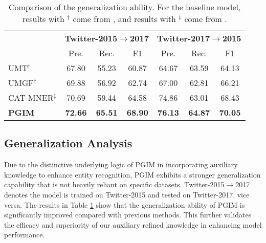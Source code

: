 \documentclass[11pt]{article}
\begin{document}
\begin{table*}[!]
\begin{tabular}{lcccc|ccc|c|c|c}
\bottomrule
\end{tabular}
\caption{Comparison of MoRe with PGIM. Since the original paper of MoRe \citep{wang2022named} did not report its Single Type (F1) on the Twitter-2015 and Twitter-2017 datasets, we run its released code and count the results. All of the results are averaged from 3 runs with different random seeds. }
\label{tab:PGIM&MORE}
\end{table*}


\begin{table}[t!]
\small
\setlength\tabcolsep{3pt}
\renewcommand{\arraystretch}{1.2}
\centering
\begin{tabular}{l|cccccc}
\toprule
& \multicolumn{3}{c|}{\textbf{Twitter-2015}$\rightarrow$\textbf{2017}}& \multicolumn{3}{c}{\textbf{Twitter-2017}$\rightarrow$\textbf{2015}}\\
& Pre. & Rec. & \multicolumn{1}{c|}{F1}  & Pre. & Rec. & \multicolumn{1}{c}{F1}    \\
\midrule
UMT$^\dag$     & 67.80  & 55.23 & \multicolumn{1}{c|}{60.87}  & 64.67  & 63.59 & 64.13  \\
UMGF$^\dag$     & 69.88 & 56.92 & \multicolumn{1}{c|}{62.74} & 67.00 & 62.81 & 66.21 \\
CAT-MNER$^\ddag$  & 70.69 & 59.44 & \multicolumn{1}{c|}{64.58} & 74.86 & 63.01 & 68.43 \\
\textbf{PGIM}      & \textbf{72.66} & \textbf{65.51} & \multicolumn{1}{c|}{\textbf{68.90}} & \textbf{76.13} & \textbf{64.87} & \textbf{70.05} \\
\bottomrule
\end{tabular}
\caption{Comparison of the generalization ability. For the baseline model, results with $^\dag$ come from \citet{zhang2021multi}, and results with $^\ddag$ come from \citet{wang2022cat}.  }
\label{tab:generalization ability}
\end{table}


\subsection{Generalization Analysis}
Due to the distinctive underlying logic of PGIM in incorporating auxiliary knowledge to enhance entity recognition, PGIM exhibits a stronger generalization capability that is not heavily reliant on specific datasets. Twitter-2015$\rightarrow$2017 denotes the model is trained on Twitter-2015 and tested on Twitter-2017, vice versa. The results in Table \ref{tab:generalization ability} show that the generalization ability of PGIM is significantly improved compared with previous methods. This further validates the efficacy and superiority of our auxiliary refined knowledge in enhancing model performance.
\end{document}
